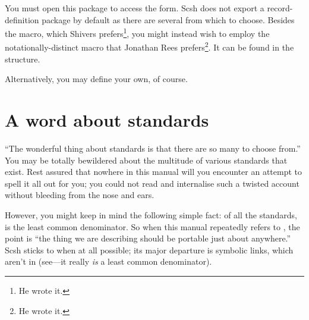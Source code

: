 You must open this package to access the form.
Scsh does not export a record-definition package by default as there are
several from which to choose.
Besides the  macro, which Shivers prefers\footnote{He wrote
it.}, you might instead wish to employ the notationally-distinct
 macro that Jonathan Rees 
prefers\footnote{He wrote it.}.
It can be found in the 
 structure.

Alternatively, you may define your own, of course.


\section{A word about {\Unix} standards}
``The wonderful thing about {\Unix} standards is that there are so many
to choose from.''
You may be totally bewildered about the multitude of various standards that
exist.
Rest assured that nowhere in this manual will you encounter an attempt
to spell it all out for you;
you could not read and internalise such a twisted account without
bleeding from the nose and ears.

However, you might keep in mind the following simple fact: of all the
standards, {\Posix} is the least common denominator.
So when this manual repeatedly refers to {\Posix}, the point is ``the
thing we are describing should be portable just about anywhere.''
Scsh sticks to {\Posix} when at all possible; its major departure is
symbolic links, which aren't in {\Posix} (see---it 
really \emph{is} a least common denominator).

